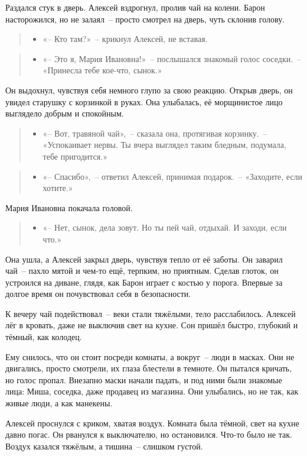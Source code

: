 \documentclass[12pt,a4paper]{book}
\newenvironment{dialogue}{\begin{quote}\itshape\begin{itemize}\item[]}{\end{itemize}\end{quote}}
\begin{document}
Раздался стук в дверь. Алексей вздрогнул, пролив чай на колени. Барон насторожился, но не залаял~-- просто смотрел на дверь, чуть склонив голову.

\begin{dialogue}
«-- Кто там?»~-- крикнул Алексей, не вставая.
\end{dialogue}

\begin{dialogue}
«-- Это я, Мария Ивановна!»~-- послышался знакомый голос соседки.~-- «Принесла тебе кое-что, сынок.»
\end{dialogue}

Он выдохнул, чувствуя себя немного глупо за свою реакцию. Открыв дверь, он увидел старушку с корзинкой в руках. Она улыбалась, её морщинистое лицо выглядело добрым и спокойным.

\begin{dialogue}
«-- Вот, травяной чай»,~-- сказала она, протягивая корзинку.~-- «Успокаивает нервы. Ты вчера выглядел таким бледным, подумала, тебе пригодится.»
\end{dialogue}

\begin{dialogue}
«-- Спасибо»,~-- ответил Алексей, принимая подарок.~-- «Заходите, если хотите.»
\end{dialogue}

Мария Ивановна покачала головой.

\begin{dialogue}
«-- Нет, сынок, дела зовут. Но ты пей чай, отдыхай. И заходи, если что.»
\end{dialogue}

Она ушла, а Алексей закрыл дверь, чувствуя тепло от её заботы. Он заварил чай~-- пахло мятой и чем-то ещё, терпким, но приятным. Сделав глоток, он устроился на диване, глядя, как Барон играет с костью у порога. Впервые за долгое время он почувствовал себя в безопасности.

К вечеру чай подействовал~-- веки стали тяжёлыми, тело расслабилось. Алексей лёг в кровать, даже не выключив свет на кухне. Сон пришёл быстро, глубокий и тёмный, как колодец.

Ему снилось, что он стоит посреди комнаты, а вокруг~-- люди в масках. Они не двигались, просто смотрели, их глаза блестели в темноте. Он пытался кричать, но голос пропал. Внезапно маски начали падать, и под ними были знакомые лица: Миша, соседка, даже продавец из магазина. Они улыбались, но не так, как живые люди, а как манекены.

Алексей проснулся с криком, хватая воздух. Комната была тёмной, свет на кухне давно погас. Он рванулся к выключателю, но остановился. Что-то было не так. Воздух казался тяжёлым, а тишина~-- слишком густой.
\end{document}
